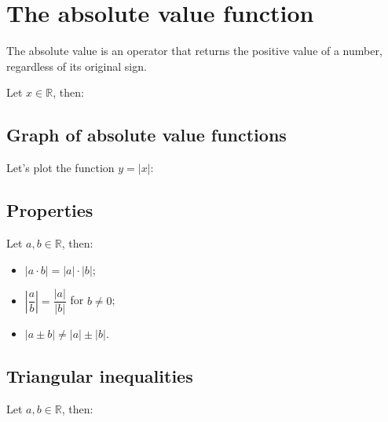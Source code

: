 \documentclass{article}
\begin{document}
\section{The absolute value function}
The absolute value is an operator that returns the positive value of a
number, regardless of its original sign.

Let $x \in \mathbb{R}$, then:

\subsection{Graph of absolute value functions}
Let's plot the function $y=|x|$:
\begin{figure}[ht!]
    \centering
\end{figure}

\subsection{Properties}
Let $a,b \in \mathbb{R}$, then:
\begin{itemize}
    \item $|a\cdot b|=|a| \cdot |b|$;
    \item $\left\vert\dfrac{a}{b}\right\vert= \dfrac{|a|}{|b|} $ for $b \neq 0$;
    \item $|a\pm b| \neq |a|\pm |b|$.
\end{itemize}

\newpage
\subsection{Triangular inequalities}
Let $a,b \in \mathbb{R}$, then:
\end{document}
